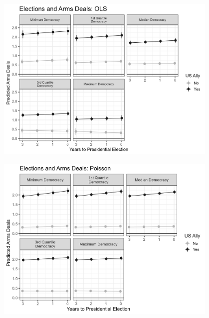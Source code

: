 \documentclass[12pt]{article}
\begin{document}
\begin{figure}[htpb]
	\centering
		\includegraphics[width=0.95\textwidth]{deals-pred-ols.png}
	\caption{}
	\label{fig:deals-pred-ols}
\end{figure}



\begin{figure}[htpb]
	\centering
		\includegraphics[width=0.95\textwidth]{deals-pred-pois.png}
	\caption{}
	\label{fig:deals-pred-ols}
\end{figure}
\end{document}
